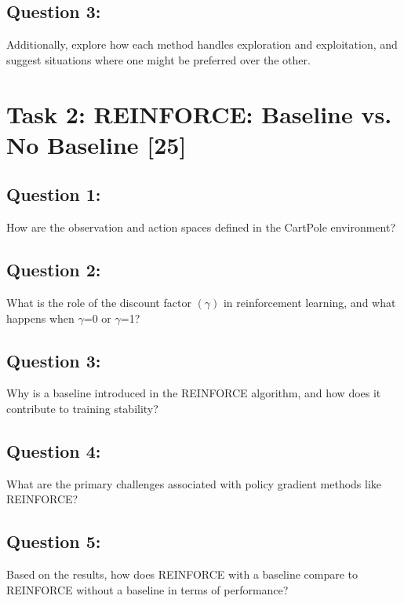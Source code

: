 \documentclass[12pt]{article}
\begin{document}
{{{\subsection{Question 3:}
Additionally, explore how each method handles exploration and exploitation, and suggest situations where one might be preferred over the other. 

\newpage

\section{Task 2: REINFORCE: Baseline vs. No Baseline [25]}

\subsection{Question 1:}

How are the observation and action spaces defined in the CartPole environment?
\vspace*{0.3cm}

\subsection{Question 2:}

What is the role of the discount factor $(\gamma)$ in reinforcement learning, and what happens when $\gamma$=0 or $\gamma$=1?
\vspace*{0.3cm}

\subsection{Question 3:}

Why is a baseline introduced in the REINFORCE algorithm, and how does it contribute to training stability?
\vspace*{0.3cm}

\subsection{Question 4:}

What are the primary challenges associated with policy gradient methods like REINFORCE?
\vspace*{0.3cm}

\subsection{Question 5:}

Based on the results, how does REINFORCE with a baseline compare to REINFORCE without a baseline in terms of performance?
\vspace*{0.3cm}

}}}
\end{document}

